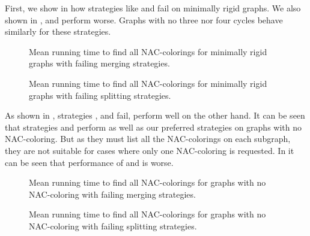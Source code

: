 First, we show in 
how strategies like \Log{} and \PromisingCycles{} fail on minimally rigid graphs.
We also shown in ,
\KernighanLin{} and \Cuts{} perform worse.
%
Graphs with no three nor four cycles behave similarly for these strategies.
%
\begin{figure}[thbp]
	\centering
	\scalebox{\BenchFigureScale}{}
	\caption[Failing merging strategies for minimally rigid graphs]{
		Mean running time to find all NAC-colorings for minimally rigid graphs with failing merging strategies.}%
	\label{fig:graph_mimimally_rigid_failing_merging_first_runtime}
\end{figure}%
\begin{figure}[thbp]
	\centering
	\scalebox{\BenchFigureScale}{}
	\caption[Failing splitting strategies for minimally rigid graphs]{
		Mean running time to find all NAC-colorings for minimally rigid graphs with failing splitting strategies.}%
	\label{fig:graph_mimimally_rigid_failing_split_first_runtime}
\end{figure}%


As shown in ,
strategies \Log{}, \SortedBits{} and \MinMax{} fail,
\PromisingCycles{} perform well on the other hand.
%
It can be seen that strategies \SortedSize{} and \Score{} perform
as well as our preferred strategies on graphs with no NAC-coloring.
But as they must list all the NAC-colorings on each subgraph,
they are not suitable for cases where only one NAC-coloring is requested.
%
In 
it can be seen that performance of \KernighanLin{} and \Cuts{} is worse.
%
\begin{figure}[thbp]
	\centering
	\scalebox{\BenchFigureScale}{}
	\caption[Failing merging strategies for graphs with no NAC-coloring]{
		Mean running time to find all NAC-colorings for graphs with no NAC-coloring with failing merging strategies.}%
	\label{fig:graph_no_nac_coloring_generated_rigid_failing_merging_first_runtime}
\end{figure}%
\begin{figure}[thbp]
	\centering
	\scalebox{\BenchFigureScale}{}
	\caption[Failing splitting strategies for graphs with no NAC-coloring]{
		Mean running time to find all NAC-colorings for graphs with no NAC-coloring with failing splitting strategies.}%
	\label{fig:graph_no_nac_coloring_generated_rigid_failing_split_first_runtime}
\end{figure}%


